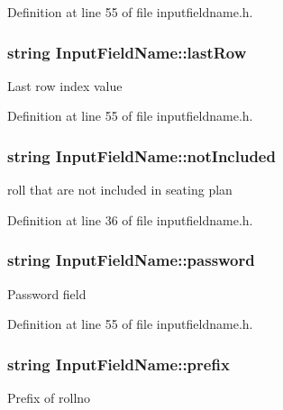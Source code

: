 Definition at line 55 of file inputfieldname.\-h.

\hypertarget{classInputFieldName_a12e0f0ec0ad7962271d6dae576e5ee0a}{
\subsubsection[{last\-Row}]{\setlength{\rightskip}{0pt plus 5cm}string Input\-Field\-Name\-::last\-Row}}\label{classInputFieldName_a12e0f0ec0ad7962271d6dae576e5ee0a}
Last row index value 

Definition at line 55 of file inputfieldname.\-h.

\hypertarget{classInputFieldName_a9ee6ee84737e1199bdfd9fb24c82c2c7}{
\subsubsection[{not\-Included}]{\setlength{\rightskip}{0pt plus 5cm}string Input\-Field\-Name\-::not\-Included}}\label{classInputFieldName_a9ee6ee84737e1199bdfd9fb24c82c2c7}
roll that are not included in seating plan 

Definition at line 36 of file inputfieldname.\-h.

\hypertarget{classInputFieldName_a318f819ef4663d7e5f40d91180093cb9}{
\subsubsection[{password}]{\setlength{\rightskip}{0pt plus 5cm}string Input\-Field\-Name\-::password}}\label{classInputFieldName_a318f819ef4663d7e5f40d91180093cb9}
Password field 

Definition at line 55 of file inputfieldname.\-h.

\hypertarget{classInputFieldName_a161d155f8faca2c5dea1bbd607b17553}{
\subsubsection[{prefix}]{\setlength{\rightskip}{0pt plus 5cm}string Input\-Field\-Name\-::prefix}}\label{classInputFieldName_a161d155f8faca2c5dea1bbd607b17553}
Prefix of rollno 

